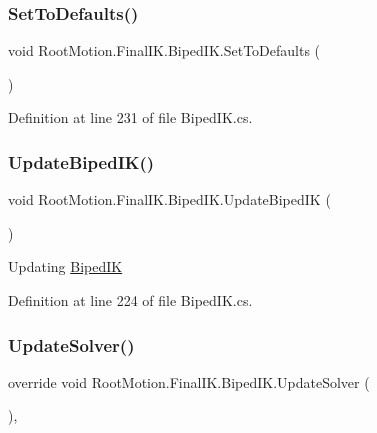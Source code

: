 \subsubsection{\texorpdfstring{Set\+To\+Defaults()}{SetToDefaults()}}
{\footnotesize\ttfamily void Root\+Motion.\+Final\+I\+K.\+Biped\+I\+K.\+Set\+To\+Defaults (\begin{DoxyParamCaption}{ }\end{DoxyParamCaption})}



Definition at line 231 of file Biped\+I\+K.\+cs.

\mbox{\label{class_root_motion_1_1_final_i_k_1_1_biped_i_k_a98cf2065a4b9994d94d6ac4c5a5437bd}} 
\subsubsection{\texorpdfstring{Update\+Biped\+I\+K()}{UpdateBipedIK()}}
{\footnotesize\ttfamily void Root\+Motion.\+Final\+I\+K.\+Biped\+I\+K.\+Update\+Biped\+IK (\begin{DoxyParamCaption}{ }\end{DoxyParamCaption})}



Updating \mbox{\hyperlink{class_root_motion_1_1_final_i_k_1_1_biped_i_k}{Biped\+IK}} 



Definition at line 224 of file Biped\+I\+K.\+cs.

\mbox{\label{class_root_motion_1_1_final_i_k_1_1_biped_i_k_a75e17e27c32670ddad2172f03e245632}} 
\subsubsection{\texorpdfstring{Update\+Solver()}{UpdateSolver()}}
{\footnotesize\ttfamily override void Root\+Motion.\+Final\+I\+K.\+Biped\+I\+K.\+Update\+Solver (\begin{DoxyParamCaption}{ }\end{DoxyParamCaption})\hspace{0.3cm}{\ttfamily [protected]}, {\ttfamily [virtual]}}



